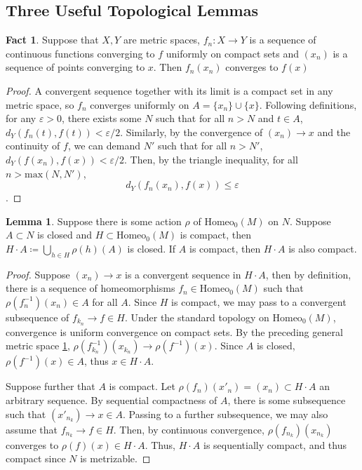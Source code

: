 \documentclass[10pt, oneside]{article}
\newcommand{\homeo}[1][S^1]{\text{Homeo}_0(#1)}
\theoremstyle{definition}
\newtheorem{lem}{Lemma}[section]
\newtheorem{fact}{Fact}
\theoremstyle{definition}
\begin{document}
\subsection{Three Useful Topological Lemmas}\label{subsec:top-lemmas}
\begin{fact}\label{compact-converg-imply-cont}
    Suppose that $X, Y$ are metric spaces, $f_n: X\to Y$ is a sequence of continuous functions converging to $f$ uniformly on compact sets and $(x_n)$ is a sequence of points converging to $x$. Then $f_n(x_n)$ converges to $f(x)$
\end{fact}
\begin{proof}
    A convergent sequence together with its limit is a compact set in any metric space, so $f_n$ converges uniformly on $A = \{x_n\}\cup\{x\}$. Following definitions, for any $\varepsilon > 0$, there exists some $N$ such that for all $n> N$ and $t \in A$, $d_Y(f_n(t), f(t)) < \varepsilon/2$. Similarly, by the convergence of $(x_n)\to x$ and the continuity of $f$, we can demand $N'$ such that for all $n>N'$, $d_Y(f(x_n), f(x)) < \varepsilon/2$. Then, by the triangle inequality, for all $n>\text{max}(N, N')$, $$d_Y(f_n(x_n), f(x)) \leq \varepsilon$$.
\end{proof}

\begin{lem}\label{lem:union-over-cpct}
    Suppose there is some action $\rho$ of $\homeo[M]$ on $N$. Suppose $A\subset N$ is closed and $H\subset\homeo[M]$ is compact, then $H\cdot A \coloneqq \bigcup_{h\in H} \rho(h)(A)$ is closed. If $A$ is compact, then $H\cdot A$ is also compact.
\end{lem}

\begin{proof}
    Suppose $(x_n)\to x$ is a convergent sequence in $H\cdot A$, then by definition, there is a sequence of homeomorphisms $f_n\in \homeo[M]$ such that $\rho(f_n^{-1})(x_n)\in A$ for all $A$. Since $H$ is compact, we may pass to a convergent subsequence of $f_{k_n}\to f\in H$. Under the standard topology on $\homeo[M]$, convergence is uniform convergence on compact sets. By the preceding general metric space \cref{compact-converg-imply-cont}, $\rho(f^{-1}_{k_n})(x_{k_n}) \to \rho(f^{-1})(x)$. Since $A$ is closed, $\rho(f^{-1})(x)\in A$, thus $x\in H\cdot A$.

    Suppose further that $A$ is compact. Let $\rho(f_n)(x'_n)=(x_n)\subset H\cdot A$ an arbitrary sequence. By sequential compactness of $A$, there is some subsequence such that $(x'_{n_k})\to x\in A$. Passing to a further subsequence, we may also assume that $f_{n_k}\to f\in H$. Then, by continuous convergence, $\rho(f_{n_k})(x_{n_k})$ converges to $\rho(f)(x)\in H\cdot A$. Thus, $H\cdot A$ is sequentially compact, and thus compact since $N$ is metrizable.
\end{proof}
\end{document}
